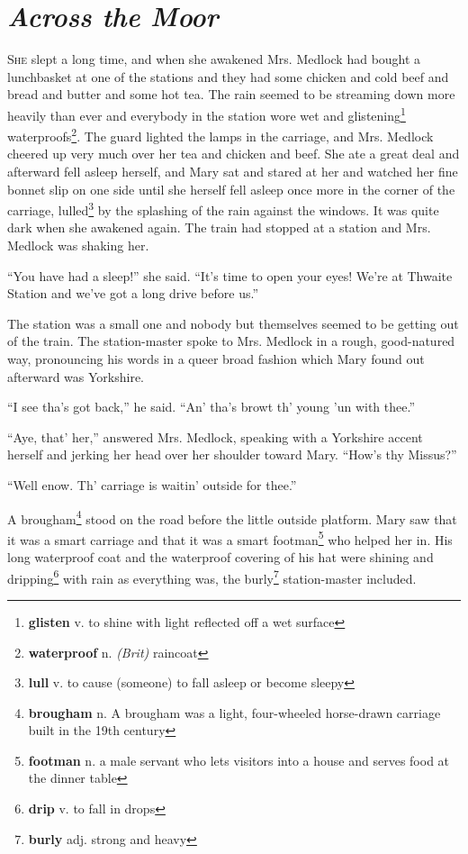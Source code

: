 \chapter{\textit{Across the Moor}}
\lettrine{S}{he} slept a long time, and when she awakened Mrs. Medlock had bought a lunchbasket at one of the stations and they had some chicken and cold beef and bread and butter and some hot tea. The rain seemed to be streaming down more heavily than ever and everybody in the station wore wet and glistening\footnote{\textbf{glisten} v. to shine with light reflected off a wet surface} waterproofs\footnote{\textbf{waterproof} n. \textit{(Brit)} raincoat}. The guard lighted the lamps in the carriage, and Mrs. Medlock cheered up very much over her tea and chicken and beef. She ate a great deal and afterward fell asleep herself, and Mary sat and stared at her and watched her fine bonnet slip on one side until she herself fell asleep once more in the corner of the carriage, lulled\footnote{\textbf{lull} v. to cause (someone) to fall asleep or become sleepy} by the splashing of the rain against the windows. It was quite dark when she awakened again. The train had stopped at a station and Mrs. Medlock was shaking her.

``You have had a sleep!'' she said. ``It's time to open your eyes! We're at Thwaite Station and we've got a long drive before us.''

The station was a small one and nobody but themselves seemed to be getting out of the train. The station-master spoke to Mrs. Medlock in a rough, good-natured way, pronouncing his words in a queer broad fashion which Mary found out afterward was Yorkshire.

``I see tha's got back,'' he said. ``An' tha's browt th' young 'un with thee.''

``Aye, that' her,'' answered Mrs. Medlock, speaking with a Yorkshire accent herself and jerking her head over her shoulder toward Mary. ``How's thy Missus?''

``Well enow. Th' carriage is waitin' outside for thee.''

A brougham\footnote{\textbf{brougham} n. A brougham was a light, four-wheeled horse-drawn carriage built in the 19th century} stood on the road before the little outside platform. Mary saw that it was a smart carriage and that it was a smart footman\footnote{\textbf{footman} n. a male servant who lets visitors into a house and serves food at the dinner table} who helped her in. His long waterproof coat and the waterproof covering of his hat were shining and dripping\footnote{\textbf{drip} v. to fall in drops} with rain as everything was, the burly\footnote{\textbf{burly} adj. strong and heavy} station-master included.
